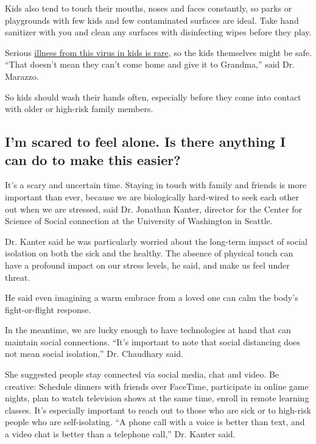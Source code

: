 Kids also tend to touch their mouths, noses and faces constantly, so
parks or playgrounds with few kids and few contaminated surfaces are
ideal. Take hand sanitizer with you and clean any surfaces with
disinfecting wipes before they play.

Serious
\href{https://www.nytimes3xbfgragh.onion/2020/02/05/health/coronavirus-children.html}{illness
from this virus in kids is rare}, so the kids themselves might be safe.
``That doesn't mean they can't come home and give it to Grandma,'' said
Dr. Marazzo.

So kids should wash their hands often, especially before they come into
contact with older or high-risk family members.

\hypertarget{im-scared-to-feel-alone-is-there-anything-i-can-do-to-make-this-easier}{%
\subsection{I'm scared to feel alone. Is there anything I can do to make
this
easier?}\label{im-scared-to-feel-alone-is-there-anything-i-can-do-to-make-this-easier}}

It's a scary and uncertain time. Staying in touch with family and
friends is more important than ever, because we are biologically
hard-wired to seek each other out when we are stressed, said Dr.
Jonathan Kanter, director for the Center for Science of Social
connection at the University of Washington in Seattle.

Dr. Kanter said he was particularly worried about the long-term impact
of social isolation on both the sick and the healthy. The absence of
physical touch can have a profound impact on our stress levels, he said,
and make us feel under threat.

He said even imagining a warm embrace from a loved one can calm the
body's fight-or-flight response.

In the meantime, we are lucky enough to have technologies at hand that
can maintain social connections. ``It's important to note that social
distancing does not mean social isolation,'' Dr. Chaudhary said.

She suggested people stay connected via social media, chat and video. Be
creative: Schedule dinners with friends over FaceTime, participate in
online game nights, plan to watch television shows at the same time,
enroll in remote learning classes. It's especially important to reach
out to those who are sick or to high-risk people who are self-isolating.
``A phone call with a voice is better than text, and a video chat is
better than a telephone call,'' Dr. Kanter said.

